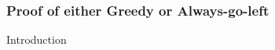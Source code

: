 \documentclass[serif,professionalfonts]{beamer}
\newcommand\scalefac{0.55}
\newcommand\ballsize{5mm}
\newcommand\nrbins{6}
\newcommand\padding{0.1*\ballsize}
\newcommand\bingap{1.6*\balldiameter}
\newcommand\balldiameter{2*\ballsize}
\newcommand\bin[1]{
	\path node[topflat, xshift=#1*\bingap*\scalefac, above, yshift=-\padding*\scalefac]  {};
}
\newcommand\bins{
	\foreach \ibin in {1,...,\nrbins}
		\bin{\ibin};
}
\newcommand\ball[2]{
	\shade[ballstyle] (#1*\bingap,#2*\balldiameter-\ballsize) circle (\ballsize)
}
\newcommand\putinbin[2]{
	\ifnum #2 > 0
		\foreach \nrballs in {1,...,#2}
 			\ball{#1}{\nrballs};
 	\fi
}
\newcounter{index}
\newcommand\balls[1]{%
	\getargsC{#1}%
  	\setcounter{index}{0}%
  	\whiledo{\theindex < \narg}{%
    		\stepcounter{index}%
    		\putinbin{\theindex}{\csname arg\romannumeral\theindex\endcsname}%
  	}%
}
\newcommand\bab[1]{%
	\bins
	\balls{#1}
}
\begin{document}
\begin{frame}
\frametitle{Proof of either Greedy or Always-go-left}
\end{frame}

\begin{comment}
\section{Test}
\begin{frame}
\frametitle{Ignore the following}
\begin{tikzpicture}[scale=\scalefac]
	\bab{1 2 3 4 5 6}
\end{tikzpicture}
\end{frame}
\end{comment}



\begin{comment}
\begin{frame}[label=references]
  \frametitle{References}
  
  
\end{frame}
\note{}
\end{comment}



\begin{frame}{Introduction}
\end{frame}
\note{}

\end{document}
